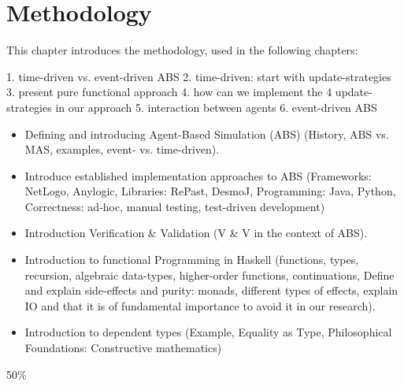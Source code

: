 \chapter{Methodology}
This chapter introduces the methodology, used in the following chapters:

1. time-driven vs. event-driven ABS
2. time-driven: start with update-strategies
3. present pure functional approach
4. how can we implement the 4 update-strategies in our approach
5. interaction between agents
6. event-driven ABS

\begin{itemize}
	\item Defining and introducing Agent-Based Simulation (ABS) (History, ABS vs. MAS, examples, event- vs. time-driven).
	\item Introduce established implementation approaches to ABS (Frameworks: NetLogo, Anylogic, Libraries: RePast, DesmoJ, Programming: Java, Python, Correctness: ad-hoc, manual testing, test-driven development)
	\item Introduction Verification \& Validation (V \& V in the context of ABS).
	\item Introduction to functional Programming in Haskell (functions, types, recursion, algebraic data-types, higher-order functions, continuations, Define and explain side-effects and purity: monads, different types of effects, explain IO and that it is of fundamental importance to avoid it in our research).
	\item Introduction to dependent types (Example, Equality as Type, Philosophical Foundations: Constructive mathematics)
\end{itemize}
50\%

